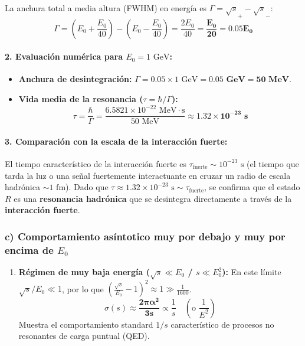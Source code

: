 \begin{problema}
La anchura total a media altura (FWHM) en energía es $\Gamma = \sqrt{s}_+ - \sqrt{s}_-$:
\begin{equation*}
\Gamma = \left( E_0 + \frac{E_0}{40} \right) - \left( E_0 - \frac{E_0}{40} \right) = \frac{2 E_0}{40} = \mathbf{\frac{E_0}{20} = 0.05 E_0}
\end{equation*}

\paragraph{2. Evaluación numérica para $E_0 = 1\text{ GeV}$:}
\begin{itemize}
    \item \textbf{Anchura de desintegración:} $\Gamma = 0.05 \times 1\text{ GeV} = \mathbf{0.05\text{ GeV} = 50\text{ MeV}}$.
    \item \textbf{Vida media de la resonancia ($\tau = \hbar / \Gamma$):}
    \begin{equation*}
    \tau = \frac{\hbar}{\Gamma} = \frac{6.5821 \times 10^{-22}\text{ MeV}\cdot\text{s}}{50\text{ MeV}} \approx \mathbf{1.32 \times 10^{-23}\text{ s}}
    \end{equation*}
\end{itemize}

\paragraph{3. Comparación con la escala de la interacción fuerte:}
El tiempo característico de la interacción fuerte es $\tau_{\text{fuerte}} \sim 10^{-23}\text{ s}$ (el tiempo que tarda la luz o una señal fuertemente interactuante en cruzar un radio de escala hadrónica $\sim 1\text{ fm}$). Dado que $\tau \approx 1.32 \times 10^{-23}\text{ s} \sim \tau_{\text{fuerte}}$, se confirma que el estado $R$ es una \textbf{resonancia hadrónica} que se desintegra directamente a través de la \textbf{interacción fuerte}.

\subsubsection*{c) Comportamiento asíntotico muy por debajo y muy por encima de $E_0$}

\begin{enumerate}[label=\arabic*.]
    \item \textbf{Régimen de muy baja energía ($\sqrt{s} \ll E_0$ / $s \ll E_0^2$):}
    En este límite $\sqrt{s}/E_0 \ll 1$, por lo que $\left( \frac{\sqrt{s}}{E_0} - 1 \right)^2 \approx 1 \gg \frac{1}{1600}$.
    \begin{equation*}
    \sigma(s) \approx \mathbf{\frac{2\pi\alpha^2}{3s}} \propto \frac{1}{s} \quad \left( \text{o } \frac{1}{E^2} \right)
    \end{equation*}
    Muestra el comportamiento standard $1/s$ característico de procesos no resonantes de carga puntual (QED).


\end{enumerate}
\end{problema}
